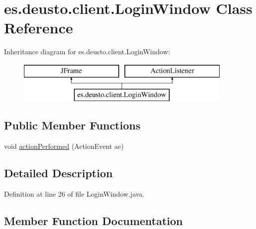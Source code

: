 \hypertarget{classes_1_1deusto_1_1client_1_1_login_window}{}\section{es.\+deusto.\+client.\+Login\+Window Class Reference}
\label{classes_1_1deusto_1_1client_1_1_login_window}
Inheritance diagram for es.\+deusto.\+client.\+Login\+Window\+:\begin{figure}[H]
\begin{center}
\leavevmode
\includegraphics[height=2.000000cm]{classes_1_1deusto_1_1client_1_1_login_window}
\end{center}
\end{figure}
\subsection*{Public Member Functions}
\begin{DoxyCompactItemize}
\item 
void \hyperlink{classes_1_1deusto_1_1client_1_1_login_window_ab04df7b435aff20c1a87e417fc9b9e2a}{action\+Performed} (Action\+Event ae)
\end{DoxyCompactItemize}


\subsection{Detailed Description}


Definition at line 26 of file Login\+Window.\+java.



\subsection{Member Function Documentation}
\mbox{\label{classes_1_1deusto_1_1client_1_1_login_window_ab04df7b435aff20c1a87e417fc9b9e2a}} 
